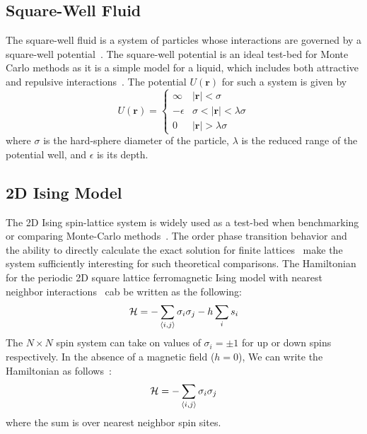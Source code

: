 \subsection{Square-Well Fluid}
The square-well fluid is a system of particles whose interactions are governed by a square-well
potential~\cite{singh2003surface, barker2004perturbationSW}.  The square-well potential is an ideal test-bed
for Monte Carlo methods as it is a simple model for a liquid, which includes both attractive and repulsive
interactions~\cite{barker1967-SW-perturbation, vega1992phase}. The potential $U(\textbf{r})$ for such a system
is given by
\begin{equation}
 U(\textbf{r})=\begin{cases} \infty &
 \lvert\textbf{r}\rvert< \sigma\\-\epsilon &
 \sigma<\lvert\textbf{r}\rvert<\lambda\sigma\\0 &
 \lvert\textbf{r}\rvert > \lambda\sigma\end{cases}
\end{equation}
where $\sigma$ is the hard-sphere diameter of the particle, $\lambda$ is the reduced range of the potential well, and $\epsilon$ is its depth.

\subsection{2D Ising Model}
The 2D Ising spin-lattice system is widely used as a test-bed when benchmarking or comparing Monte-Carlo
methods~\cite{ferdinand1969bounded, wang1999transition, trebst2004optimizing}. The  order phase
transition behavior and the ability to directly calculate the exact solution for finite
lattices~\cite{beale1996exact} make the system sufficiently interesting for such theoretical comparisons.
The Hamiltonian for the periodic 2D square lattice ferromagnetic Ising model with nearest
neighbor interactions~\cite{landau2004new} cab be written as the following:
\begin{align}
\mathcal{H} = -\sum_{\braket{i,j}} \sigma_i \sigma_j - h \sum_i s_i
\end{align}
The $N\times N$ spin system can take on values of $\sigma_i = \pm 1$
for up or down spins respectively. In the absence of a magnetic field ($h =
0$), We can write the Hamiltonian as follows~\cite{onsager1944crystal,
kaufman1949crystal}:
\begin{align}
\mathcal{H} = -\sum_{\braket{i,j}} \sigma_i \sigma_j
\end{align}
where the sum is over nearest neighbor spin sites.

